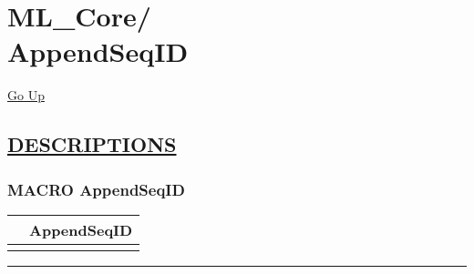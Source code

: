 \chapter*{\color{headfile}
{\large ML\_Core\slash\hspace{0pt}}
 \\
AppendSeqID
}
\hypertarget{ecldoc:toc:ML_Core.AppendSeqID}{}
\hyperlink{ecldoc:toc:root/ML_Core}{Go Up}


\section*{\underline{\textsf{DESCRIPTIONS}}}
\subsection*{\textsf{\colorbox{headtoc}{\color{white} MACRO}
AppendSeqID}}

\hypertarget{ecldoc:ml_core.appendseqid}{}

{\renewcommand{\arraystretch}{1.5}
\begin{tabularx}{\textwidth}{|>{\raggedright\arraybackslash}l|X|}
\hline
\hspace{0pt}\mytexttt{\color{red} } & \textbf{AppendSeqID} \\
\hline
\multicolumn{2}{|>{\raggedright\arraybackslash}X|}{\hspace{0pt}\mytexttt{\color{param} (dIn,idfield,dOut)}} \\
\hline
\end{tabularx}
}

\par


\rule{\linewidth}{0.5pt}
